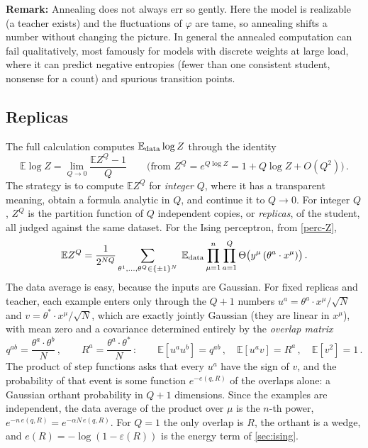 \documentclass[11pt]{article}
\newcommand{\E}{\mathbb{E}}
\begin{document}
\smallskip
\textbf{Remark:} Annealing does not always err so gently. Here the model is realizable (a teacher exists) and the fluctuations of $\varphi$ are tame, so annealing shifts a number without changing the picture. In general the annealed computation can fail qualitatively, most famously for models with discrete weights at large load, where it can predict negative entropies (fewer than one consistent student, nonsense for a count) and spurious transition points.

\subsection{Replicas}
\label{app:replica-method}

The full calculation computes $\E_{\rm data}\log Z$ through the identity
%
\begin{equation}
    \E\log Z = \lim_{Q\to0}\frac{\E Z^Q - 1}{Q}\qquad\big(\text{from } Z^Q = e^{Q\log Z} = 1 + Q\log Z + O(Q^2)\big)\,. \label{replica-identity}
\end{equation}
%
The strategy is to compute $\E Z^Q$ for \emph{integer} $Q$, where it has a transparent meaning, obtain a formula analytic in $Q$, and continue it to $Q\to0$. For integer $Q$, $Z^Q$ is the partition function of $Q$ independent copies, or \emph{replicas}, of the student, all judged against the same dataset. For the Ising perceptron, from \eqref{perc-Z},
%
\begin{equation}
    \E Z^Q = \frac{1}{2^{NQ}}\sum_{\theta^1,\ldots,\theta^Q\in\{\pm1\}^N}\;\E_{\rm data}\prod_{\mu=1}^n\prod_{a=1}^Q\Theta\big(y^\mu\,(\theta^a\cdot x^\mu)\big)\,. \label{EZn}
\end{equation}
%
The data average is easy, because the inputs are Gaussian. For fixed replicas and teacher, each example enters only through the $Q+1$ numbers $u^a = \theta^a\cdot x^\mu/\sqrt N$ and $v = \theta^*\cdot x^\mu/\sqrt N$, which are exactly jointly Gaussian (they are linear in $x^\mu$), with mean zero and a covariance determined entirely by the \emph{overlap matrix}
%
\begin{equation}
    q^{ab} = \frac{\theta^a\cdot\theta^b}{N}\,,\qquad R^a = \frac{\theta^a\cdot\theta^*}{N}\,:\qquad
    \E[u^au^b] = q^{ab}\,,\quad \E[u^av] = R^a\,,\quad \E[v^2] = 1\,. \label{overlap-matrix}
\end{equation}
%
The product of step functions asks that every $u^a$ have the sign of $v$, and the probability of that event is some function $e^{-e(q,R)}$ of the overlaps alone: a Gaussian orthant probability in $Q+1$ dimensions. Since the examples are independent, the data average of the product over $\mu$ is the $n$-th power, $e^{-n\,e(q,R)} = e^{-\alpha N\,e(q,R)}$. For $Q=1$ the only overlap is $R$, the orthant is a wedge, and $e(R) = -\log(1-\varepsilon(R))$ is the energy term of \cref{sec:ising}.
\end{document}
